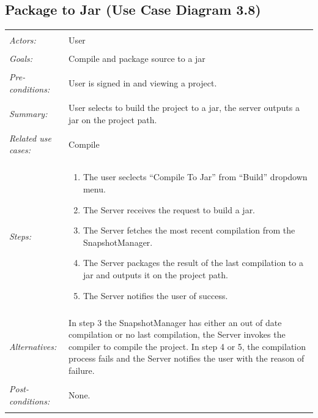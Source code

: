 \documentclass[11pt]{report}
\begin{document}
\subsection{Package to Jar (Use Case Diagram 3.8)}
\begin{tabular}{ p{2cm} p{12cm} }
     \hline
     \\
     \textit{Actors:} & User \\ 
     \\
     \textit{Goals:} & Compile and package source to a jar\\
     \\
     \textit{Pre-conditions:} & User is signed in and viewing a project. \\
     \\
     \textit{Summary:} & User selects to build the project to a jar, the server outputs a jar on the project path. \\
     \\
     \textit{Related use cases:} & Compile \\ 
     \\
     \textit{Steps:} & \begin{enumerate}
        \item The user seclects ``Compile To Jar'' from ``Build'' dropdown menu.
        \item The Server receives the request to build a jar.
        \item The Server fetches the most recent compilation from the SnapshotManager.
        \item The Server packages the result of the last compilation to a jar and outputs it on the project path.
        \item The Server notifies the user of success.
     \end{enumerate} \\
     \\
     \textit{Alternatives:} & In step 3 the SnapshotManager has either an out of date compilation or no last compilation, the Server invokes the compiler to compile the project. In step 4 or 5, the compilation process fails and the Server notifies the user with the reason of failure. \\
     \\
     \textit{Post-conditions:} & None. \\
     \\
    \hline
\end{tabular}
\end{document}
